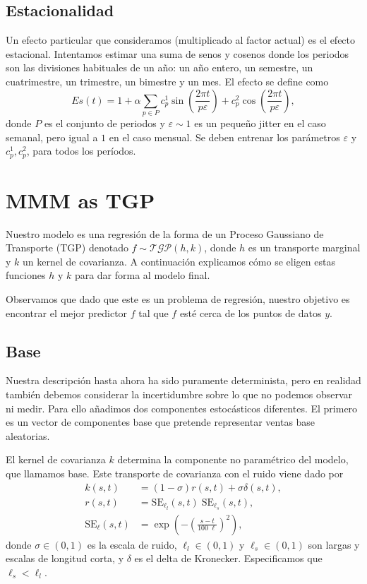 \subsection{Estacionalidad}

Un efecto particular que consideramos (multiplicado al factor actual) es el efecto estacional. Intentamos estimar una suma de senos y cosenos donde los periodos son las divisiones habituales de un año: un año entero, un semestre, un cuatrimestre, un trimestre, un bimestre y un mes. El efecto se define como
\[ Es(t) = 1 + \alpha \sum_{p\in P} c^1_p \sin\left(\frac{2\pi t}{p \varepsilon}\right) + c^2_p \cos \left(\frac{2\pi t}{p \varepsilon}\right),\]
donde \(P\) es el conjunto de periodos y \(\varepsilon \sim 1\) es un pequeño jitter en el caso semanal, pero igual a \(1\) en el caso mensual. Se deben entrenar los parámetros \(\varepsilon\) y \(c^1_p, c^2_p\), para todos los períodos.

\section{MMM as TGP}

Nuestro modelo es una regresión de la forma de un Proceso Gaussiano de Transporte (TGP) denotado \(f \sim \mathcal{TGP}(h, k)\), donde \(h\) es un transporte marginal y \(k\) un kernel de covarianza. A continuación explicamos cómo se eligen estas funciones \(h\) y \(k\) para dar forma al modelo final.

Observamos que dado que este es un problema de regresión, nuestro objetivo es encontrar el mejor predictor \(f\) tal que \(f\) esté cerca de los puntos de datos \(y\).

\subsection{Base}

Nuestra descripción hasta ahora ha sido puramente determinista, pero en realidad también debemos considerar la incertidumbre sobre lo que no podemos observar ni medir. Para ello añadimos dos componentes estocásticos diferentes. El primero es un vector de componentes base que pretende representar ventas base aleatorias.

El kernel de covarianza \(k\) determina la componente no paramétrico del modelo, que llamamos base. Este transporte de covarianza con el ruido viene dado por
\begin{align*}
k(s, t)	&= (1-\sigma) r(s, t) + \sigma \delta(s, t),\\
r(s, t)	&= \mathrm{SE}_{\ell_l}(s, t) \; \mathrm{SE}_{\ell_s}(s, t),\\
\mathrm{SE}_{\ell}(s, t) &= \exp\left( -\left(\frac{s-t}{100 \; \ell}\right)^2 \right),
\end{align*}
donde \(\sigma \in (0, 1)\) es la escala de ruido, \(\ell_l \in (0, 1)\) y \(\ell_s \in (0, 1)\) son largas y escalas de longitud corta, y \(\delta\) es el delta de Kronecker. Especificamos que \(\ell_s < \ell_l\).

